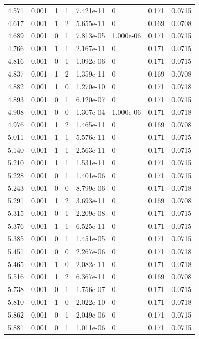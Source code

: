 \documentclass[preview]{standalone}
\begin{document}
{{{\begin{tabular}{L{1.2cm}C{1.2cm} C{0.3cm}C{0.5cm} C{1.4cm}C{1.4cm} C{1.4cm}C{1.4cm}}
  4.571  &  0.001  & 1     &  1 &  7.421e-11  & 0  & 0.171 &  0.0715   \\ 
  4.617  &  0.001  & 1     &  2 &  5.655e-11  & 0  & 0.169 &  0.0708   \\ 
  4.689  &  0.001  & 0     &  1 &  7.813e-05  & 1.000e-06  & 0.171 &  0.0715   \\ 
  4.766  &  0.001  & 1     &  1 &  2.167e-11  & 0  & 0.171 &  0.0715   \\ 
  4.816  &  0.001  & 0     &  1 &  1.092e-06  & 0  & 0.171 &  0.0715   \\ 
  4.837  &  0.001  & 1     &  2 &  1.359e-11  & 0  & 0.169 &  0.0708   \\ 
  4.882  &  0.001  & 1     &  0 &  1.270e-10  & 0  & 0.171 &  0.0718   \\ 
  4.893  &  0.001  & 0     &  1 &  6.120e-07  & 0  & 0.171 &  0.0715   \\ 
  4.908  &  0.001  & 0     &  0 &  1.307e-04  & 1.000e-06  & 0.171 &  0.0718   \\ 
  4.976  &  0.001  & 1     &  2 &  1.465e-11  & 0  & 0.169 &  0.0708   \\ 
  5.011  &  0.001  & 1     &  1 &  5.576e-11  & 0  & 0.171 &  0.0715   \\ 
  5.140  &  0.001  & 1     &  1 &  2.563e-11  & 0  & 0.171 &  0.0715   \\ 
  5.210  &  0.001  & 1     &  1 &  1.531e-11  & 0  & 0.171 &  0.0715   \\ 
  5.228  &  0.001  & 0     &  1 &  1.401e-06  & 0  & 0.171 &  0.0715   \\ 
  5.243  &  0.001  & 0     &  0 &  8.799e-06  & 0  & 0.171 &  0.0718   \\ 
  5.291  &  0.001  & 1     &  2 &  3.693e-11  & 0  & 0.169 &  0.0708   \\ 
  5.315  &  0.001  & 0     &  1 &  2.209e-08  & 0  & 0.171 &  0.0715   \\ 
  5.376  &  0.001  & 1     &  1 &  6.525e-11  & 0  & 0.171 &  0.0715   \\ 
  5.385  &  0.001  & 0     &  1 &  1.451e-05  & 0  & 0.171 &  0.0715   \\ 
  5.451  &  0.001  & 0     &  0 &  2.267e-06  & 0  & 0.171 &  0.0718   \\ 
  5.465  &  0.001  & 1     &  0 &  2.082e-11  & 0  & 0.171 &  0.0718   \\ 
  5.516  &  0.001  & 1     &  2 &  6.367e-11  & 0  & 0.169 &  0.0708   \\ 
  5.738  &  0.001  & 0     &  1 &  1.756e-07  & 0  & 0.171 &  0.0715   \\ 
  5.810  &  0.001  & 1     &  0 &  2.022e-10  & 0  & 0.171 &  0.0718   \\ 
  5.862  &  0.001  & 0     &  1 &  2.049e-06  & 0  & 0.171 &  0.0715   \\ 
  5.881  &  0.001  & 0     &  1 &  1.011e-06  & 0  & 0.171 &  0.0715   \\ 
\hline 
\end{tabular} 

}}}
\end{document}
